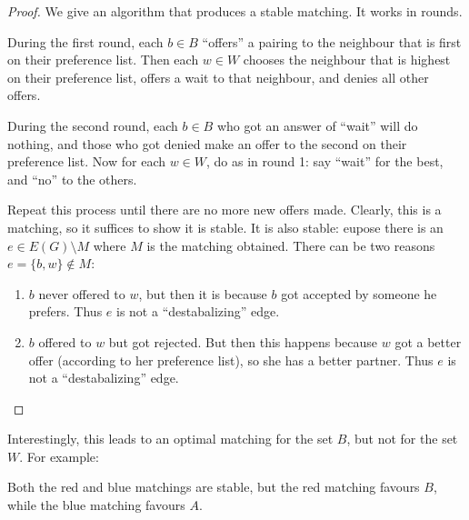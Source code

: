 \documentclass[12pt, a4paper]{book}
\theoremstyle{nonumberplain}
\newtheorem{proof}{Proof}
\begin{document}
\begin{proof}
    We give an algorithm that produces a stable matching.
    It works in rounds.

    During the first round, each $b\in B$ ``offers'' a pairing to the neighbour that is first on their preference list.
    Then each $w\in W$ chooses the neighbour that is highest on their preference list, offers a wait to that neighbour, and denies all other offers.

    During the second round, each $b\in B$ who got an answer of ``wait'' will do nothing, and those who got denied make an offer to the second on their preference list.
    Now for each $w\in W$, do as in round 1: say ``wait'' for the best, and ``no'' to the others.

    Repeat this process until there are no more new offers made.
    Clearly, this is a matching, so it suffices to show it is stable.
    It is also stable: eupose there is an $e\in E(G)\setminus M$ where $M$ is the matching obtained.
    There can be two reasons $e=\{b,w\}\notin M$:
    \begin{enumerate}[nolistsep]
        \item $b$ never offered to $w$, but then it is because $b$ got accepted by someone he prefers.
            Thus $e$ is not a ``destabalizing'' edge.
        \item $b$ offered to $w$ but got rejected.
            But then this happens because $w$ got a better offer (according to her preference list), so she has a better partner.
            Thus $e$ is not a ``destabalizing'' edge.
    \end{enumerate}
\end{proof}
Interestingly, this leads to an optimal matching for the set $B$, but not for the set $W$.
For example:
\begin{center}
\end{center}
Both the red and blue matchings are stable, but the red matching favours $B$, while the blue matching favours $A$.
\end{document}
